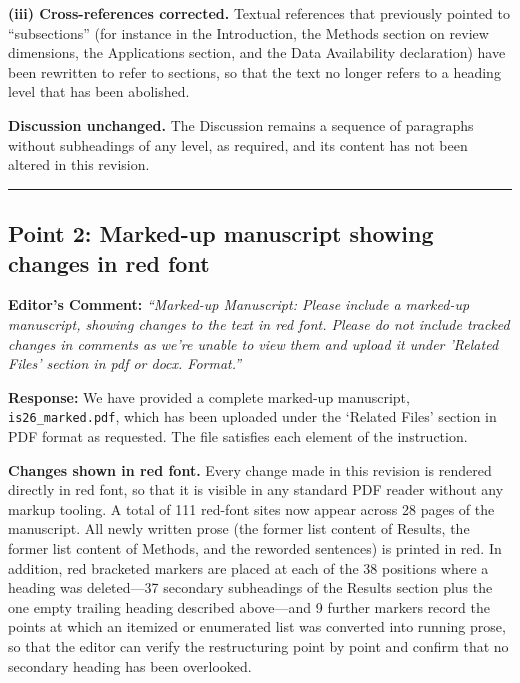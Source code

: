 \documentclass[11pt,a4paper]{article}
\begin{document}
\vspace{0.5em}
\noindent\textbf{(iii) Cross-references corrected.} Textual references that previously pointed to ``subsections'' (for instance in the Introduction, the Methods section on review dimensions, the Applications section, and the Data Availability declaration) have been rewritten to refer to sections, so that the text no longer refers to a heading level that has been abolished.

\vspace{0.5em}
\noindent\textbf{Discussion unchanged.} The Discussion remains a sequence of paragraphs without subheadings of any level, as required, and its content has not been altered in this revision.

\vspace{1.5em}
\hrule
\vspace{1.5em}

\subsection*{Point 2: Marked-up manuscript showing changes in red font}

\vspace{0.5em}
\noindent\textbf{Editor's Comment:}
\textit{``Marked-up Manuscript: Please include a marked-up manuscript, showing changes to the text in red font. Please do not include tracked changes in comments as we're unable to view them and upload it under 'Related Files' section in pdf or docx. Format.''}

\vspace{0.5em}
\noindent\textbf{Response:}
We have provided a complete marked-up manuscript, \texttt{is26\_marked.pdf}, which has been uploaded under the `Related Files' section in PDF format as requested. The file satisfies each element of the instruction.

\vspace{0.5em}
\noindent\textbf{Changes shown in red font.} Every change made in this revision is rendered directly in red font, so that it is visible in any standard PDF reader without any markup tooling. A total of 111 red-font sites now appear across 28 pages of the manuscript. All newly written prose (the former list content of Results, the former list content of Methods, and the reworded sentences) is printed in red. In addition, red bracketed markers are placed at each of the 38 positions where a heading was deleted---37 secondary subheadings of the Results section plus the one empty trailing heading described above---and 9 further markers record the points at which an itemized or enumerated list was converted into running prose, so that the editor can verify the restructuring point by point and confirm that no secondary heading has been overlooked.
\end{document}
